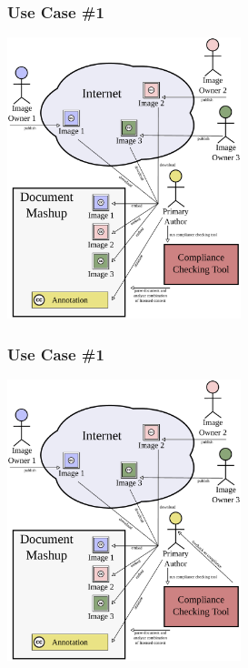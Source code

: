 \documentclass[mathserif,xcolor=dvipsnames,hyperref={bookmarks=true}]{beamer}
\begin{document}
    \begin{frame}[t]
        \frametitle{Use Case \#1}
        \begin{center}
            \includegraphics[width=0.51\textwidth]{../resources/usecases/usecase1/usecase1-step26.pdf}
        \end{center}
    \end{frame}
    \begin{frame}[t]
        \frametitle{Use Case \#1}
        \begin{center}
            \includegraphics[width=0.51\textwidth]{../resources/usecases/usecase1/usecase1-step27.pdf}
        \end{center}
    \end{frame}
\end{document}
